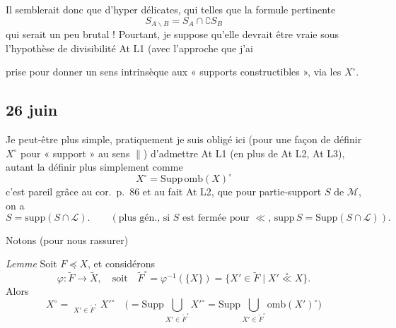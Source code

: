 \documentclass[11pt,a4paper]{article}
\begin{document}
Il semblerait donc que  \ill{} \ill{}  d'hyper\ill{}   \ill{}  \ill{} \ill{} délicates, qui \ill{}  telles que la formule pertinente
\[
  S_{A \smallsetminus B} = S_A \cap \complement S_B
\]
\ill{} qui serait un peu brutal ! Pourtant, je suppose qu'elle devrait être vraie   sous l'hypothèse de divisibilité At L1 (avec l'approche que j'ai

prise pour donner un sens intrinsèque aux « supports constructibles », via les $X^{\circ}$.

\subsection{26 juin}

Je  peut-être plus simple,  pratiquement je suis obligé ici  (pour une façon de définir $X^{\circ}$ pour « support » au sens $\parallel$)  d'admettre At L1 (en plus de At L2, At L3), autant la définir plus simplement comme
\[
  X^{\circ} = \mathrm{Supp}\, \mathrm{omb}(X)^{\circ}
\]
c'est pareil grâce au cor.\ p.~86 et au fait  \ill{} At L2, que pour \struck{\ill{}} partie-support $S$ de $\mathcal{M}$, on a
\[
  S = \mathrm{supp}(S \cap \mathcal{L}) . \qquad (\text{plus gén., si $S$ est fermée pour $\ll$, $\mathrm{supp}\, S = \mathrm{Supp}(S \cap \mathcal{L})$}) .
\]

Notons (pour nous rassurer)

\emph{Lemme} Soit  $F \preccurlyeq X$, \struck{\ill{}} et considérons
\[
  \varphi : \widetilde{F} \longrightarrow \widetilde{X} , \quad \text{soit} \quad \widetilde{F}^{\circ} = \varphi^{-1}(\lbrace X \rbrace) = \lbrace X' \in \widetilde{F} \mid X' \overset{\circ}{\ll} X \rbrace .
\]
Alors
\[
  X^{\circ} = \mathop{\mathrm{Sup}_{\Sigma}}_{X' \in \widetilde{F}^{\circ}} X'^{\circ}
  \quad \Big( = \mathrm{Supp} \bigcup_{X' \in \widetilde{F}^{\circ}} X'^{\circ} = \mathrm{Supp} \bigcup_{X' \in \widetilde{F}^{\circ}} \mathrm{omb}(X')^{\circ} \Big)
\]
\end{document}
